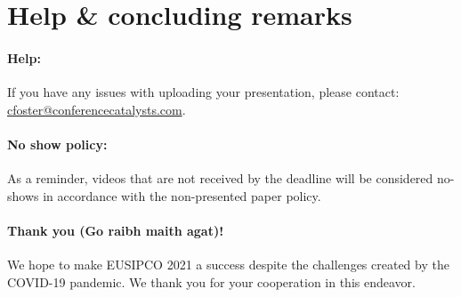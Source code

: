\documentclass[english,a4paper,11pt,oneside,onecolumn]{article}
\begin{document}
\section{Help \& concluding remarks }

\paragraph{Help:} If you have any issues with uploading your presentation, please contact: \\
\href{mailto:cfoster@conferencecatalysts.com}{cfoster@conferencecatalysts.com}.

\paragraph{No show policy:} As a reminder, videos that are not received by the deadline will be considered no-shows in accordance with the non-presented paper policy.

\paragraph{Thank you (Go raibh maith agat)!} We hope to make EUSIPCO 2021 a success despite the challenges created by the COVID-19 pandemic. We thank you for your cooperation in this endeavor.
\end{document}
